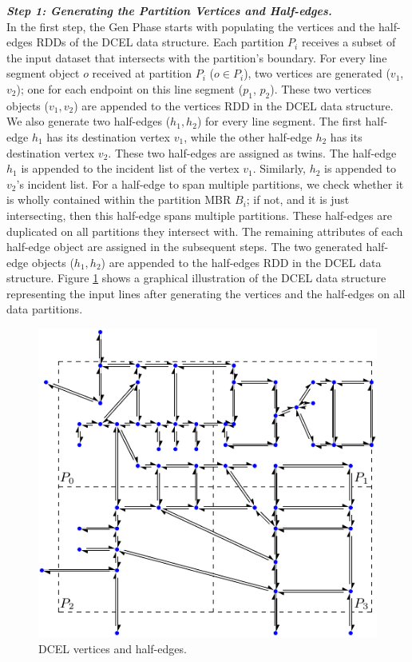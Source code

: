 \vspace{4pt}
\textit{\textbf{Step 1: Generating the Partition Vertices and Half-edges.}}
\\
In the first step, the Gen Phase starts with populating the vertices and the half-edges RDDs of the DCEL data structure.
Each partition $P_i$ receives a subset of the input dataset that intersects with the partition's boundary.
For every line segment object $o$ received at partition $P_i$ ($o \in P_i$), two vertices are generated ($v_1$, $v_2$); one for each endpoint on this line 
segment ($p_1$, $p_2$). These two vertices objects ($v_1, v_2$) are appended to the vertices RDD in the DCEL data structure.
We also generate two half-edges ($h_1, h_2$) for every line segment. 
The first half-edge $h_1$ has its destination vertex $v_1$, while the other half-edge $h_2$ has its destination vertex $v_2$. These two half-edges are assigned 
as twins.
The half-edge $h_1$ is appended to the incident list of the vertex $v_1$. Similarly, $h_2$ is appended to $v_2$'s incident list.
For a half-edge to span multiple partitions, we check whether it is wholly contained within the partition MBR $B_i$; if not, and it is just intersecting, then 
this half-edge spans multiple partitions. 
These half-edges are duplicated on all partitions they intersect with.
The remaining attributes of each half-edge object are assigned in the subsequent steps. 
The two generated half-edge objects ($h_1, h_2$) are appended to the half-edges RDD in the DCEL data structure.
Figure \ref{fig:ddcel:step1} shows a graphical illustration of the DCEL data structure representing the input lines after generating the vertices and the 
half-edges on all data partitions.

\begin{figure}[tb]
	\centering
	\includegraphics[width=0.75 \linewidth ]{chapterSDCEL/model/ddcel-1}
	\caption{DCEL vertices and half-edges.}
	\label{fig:ddcel:step1}
\end{figure}


